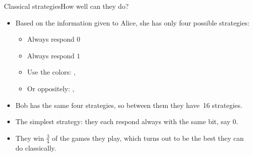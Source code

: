 {\begin{frame}{Classical strategies}{How well can they do?}
\begin{itemize}[<+->]
    \item Based on the information given to Alice, she has only four possible strategies:
    \begin{itemize}
        \item Always respond $0$
        \item Always respond $1$
        \item Use the colors:  , 
        \item Or oppositely:  , 
    \end{itemize}
    \item Bob has the same four strategies, so between them they have~16 strategies.
    \item The simplest strategy: they each respond always with the same bit, say $0$.
    \item They win $\frac{3}{4}$ of the games they play, which turns out to be the best they can do classically.
\end{itemize}
    
\end{frame}

}
